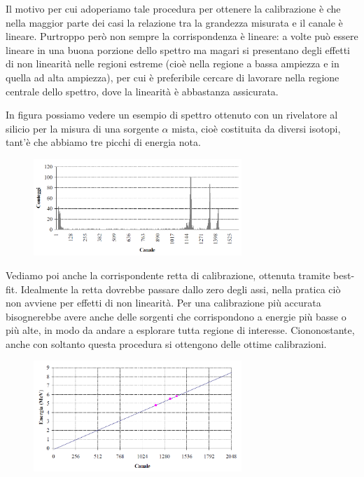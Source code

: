 Il motivo per cui adoperiamo tale procedura per ottenere la calibrazione è che nella maggior parte dei casi la relazione tra la grandezza misurata e il canale è lineare. Purtroppo però non sempre la corrispondenza è lineare: a volte può essere lineare in una buona porzione dello spettro ma magari si presentano degli effetti di non linearità nelle regioni estreme (cioè nella regione a bassa ampiezza e in quella ad alta ampiezza), per cui è preferibile cercare di lavorare nella regione centrale dello spettro, dove la linearità è abbastanza assicurata.

\begin{esempio}
   In figura possiamo vedere un esempio di spettro ottenuto con un rivelatore al silicio per la misura di una sorgente $\alpha$ mista, cioè costituita da diversi isotopi, tant'è che abbiamo tre picchi di energia nota.
   \begin{figure}[H]
      \centering
      \includegraphics[width=0.7\textwidth]{immagini/esempio_calibrazione_spettro.png}
   \end{figure}
   Vediamo poi anche la corrispondente retta di calibrazione, ottenuta tramite best-fit. Idealmente la retta dovrebbe passare dallo zero degli assi, nella pratica ciò non avviene per effetti di non linearità. Per una calibrazione più accurata bisognerebbe avere anche delle sorgenti che corrispondono a energie più basse o più alte, in modo da andare a esplorare tutta regione di interesse. Ciononostante, anche con soltanto questa procedura si ottengono delle ottime calibrazioni.
   \begin{figure}[H]
      \centering
      \includegraphics[width=0.7\textwidth]{immagini/esempio_calibrazione_retta.png}
   \end{figure}
\end{esempio}

